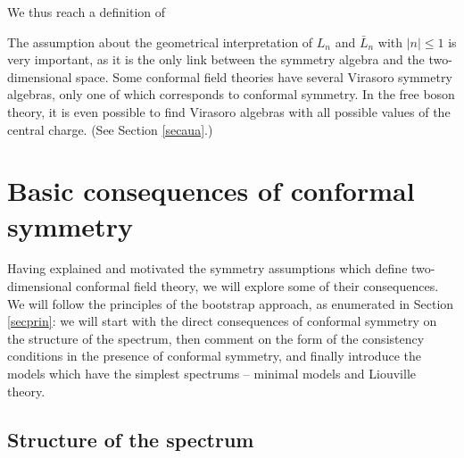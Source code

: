 \documentclass[12pt,a4paper,notitlepage]{report}
\numberwithin{equation}{section}
\theoremstyle{break}
\begin{document}
We thus reach a definition of 
\begin{center}
\end{center}
The assumption about the geometrical interpretation of $L_n$ and $\bar{L}_n$ with $|n|\leq 1$ is very important, as it is the only link between the symmetry algebra and the two-dimensional space. Some conformal field theories have several Virasoro symmetry algebras, only one of which corresponds to conformal symmetry. In the free boson theory, it is even possible to find Virasoro algebras with all possible values of the central charge. (See Section \ref{secaua}.)


\section{Basic consequences of conformal symmetry}

Having explained and motivated the symmetry assumptions which define two-dimensional conformal field theory, we will explore some of their consequences. We will follow the principles of the bootstrap approach, as enumerated in Section \ref{secprin}: we will start with the direct consequences of conformal symmetry on the structure of the spectrum, then comment on the form of the consistency conditions in the presence of conformal symmetry, and finally introduce the models which have the simplest spectrums -- minimal models and Liouville theory. 

\subsection{Structure of the spectrum \label{secsots}}
\end{document}
